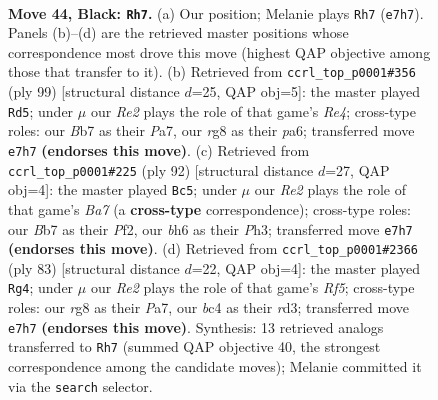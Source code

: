\documentclass[11pt]{article}
\begin{document}
\clearpage

\begin{figure}[p]\centering
\begin{subfigure}{0.46\textwidth}\centering
\resizebox{\linewidth}{!}{%
\newchessgame
\chessboard[
  setfen={6R1/pb1pr3/7B/5k2/2B5/8/PPK2n2/8 b - - 9 44},
  showmover=false,
  pgfstyle=straightmove, color=movearrow, markmove={e7-h7}
]}
\caption{}
\end{subfigure}\hfill
\begin{subfigure}{0.46\textwidth}\centering
\resizebox{\linewidth}{!}{%
\newchessgame
\chessboard[
  setfen={3k4/p7/P2n4/4r1p1/8/3B1P2/5K2/R7 b - - 1 50},
  showmover=false,
  pgfstyle=straightmove, color=movearrow, markmove={e5-d5}
]}
\caption{}
\end{subfigure}
\\[4pt]
\begin{subfigure}{0.46\textwidth}\centering
\resizebox{\linewidth}{!}{%
\newchessgame
\chessboard[
  setfen={8/B5p1/2B1k3/5p2/1P5b/3b3P/5P1K/8 w - - 3 47},
  showmover=false,
  pgfstyle=straightmove, color=movearrow, markmove={a7-c5}
]}
\caption{}
\end{subfigure}\hfill
\begin{subfigure}{0.46\textwidth}\centering
\resizebox{\linewidth}{!}{%
\newchessgame
\chessboard[
  setfen={8/pp4B1/4k3/8/1b2nr2/3R4/P3K3/R7 b - - 0 42},
  showmover=false,
  pgfstyle=straightmove, color=movearrow, markmove={f4-g4}
]}
\caption{}
\end{subfigure}
\caption{\textbf{Move 44, Black: \texttt{Rh7}.} (a) Our position; Melanie plays \texttt{Rh7} (\texttt{e7h7}). Panels (b)--(d) are the retrieved master positions whose correspondence most drove this move (highest QAP objective among those that transfer to it). (b) Retrieved from \texttt{ccrl\_top\_p0001\#356} (ply 99) [structural distance $d$=25, QAP obj=5]: the master played \texttt{Rd5}; under $\mu$ our \emph{Re2} plays the role of that game's \emph{Re4}; cross-type roles: our \emph{B}b7 as their \emph{P}a7, our \emph{r}g8 as their \emph{p}a6; transferred move \texttt{e7h7} \textbf{(endorses this move)}. (c) Retrieved from \texttt{ccrl\_top\_p0001\#225} (ply 92) [structural distance $d$=27, QAP obj=4]: the master played \texttt{Bc5}; under $\mu$ our \emph{Re2} plays the role of that game's \emph{Ba7} (a \textbf{cross-type} correspondence); cross-type roles: our \emph{B}b7 as their \emph{P}f2, our \emph{b}h6 as their \emph{P}h3; transferred move \texttt{e7h7} \textbf{(endorses this move)}. (d) Retrieved from \texttt{ccrl\_top\_p0001\#2366} (ply 83) [structural distance $d$=22, QAP obj=4]: the master played \texttt{Rg4}; under $\mu$ our \emph{Re2} plays the role of that game's \emph{Rf5}; cross-type roles: our \emph{r}g8 as their \emph{P}a7, our \emph{b}c4 as their \emph{r}d3; transferred move \texttt{e7h7} \textbf{(endorses this move)}. Synthesis: 13 retrieved analogs transferred to \texttt{Rh7} (summed QAP objective 40, the strongest correspondence among the candidate moves); Melanie committed it via the \texttt{search} selector.}
\label{fig:thought-m87}
\end{figure}
\end{document}
